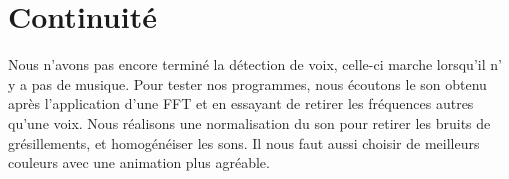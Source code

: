 \documentclass{article}
\begin{document}
\section{Continuité }

Nous n’avons pas encore terminé la détection de voix,
celle-ci marche lorsqu’il n' y a pas de musique.
Pour tester nos programmes, nous écoutons le son obtenu après
l’application d’une FFT et en essayant de retirer les fréquences
autres qu’une voix. Nous réalisons une normalisation du son pour
retirer les bruits de grésillements, et homogénéiser les sons.
Il nous faut aussi choisir de meilleurs couleurs avec une
animation plus agréable.
\end{document}
